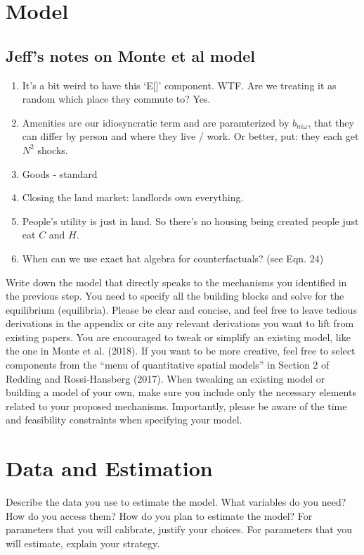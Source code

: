 \documentclass{article}
\begin{document}
\section{Model}

\subsection{Jeff's notes on Monte et al model}
\begin{enumerate}
\item It's a bit weird to have this `E[]' component. WTF. Are we treating it as random which place they commute to? Yes.
\item Amenities are our idiosyncratic term and are paramterized by $b_{ni\omega}$, that they can differ by person and where they live / work. Or better, put: they each get $N^2$ shocks.
\item Goods - standard
\item Closing the land market: landlords own everything.
\item People's utility is just in land. So there's no housing being created people just eat $C$ and $H$.
\item  When can we use exact hat algebra for counterfactuals? (see Eqn. 24)
\end{enumerate}

Write down the model that directly speaks to the mechanisms you identified
in the previous step. You need to specify all the building blocks and solve for the
equilibrium (equilibria). Please be clear and concise, and feel free to leave tedious
derivations in the appendix or cite any relevant derivations you want to lift from
existing papers.
You are encouraged to tweak or simplify an existing model, like the one in Monte et
al. (2018). If you want to be more creative, feel free to select components from the
“menu of quantitative spatial models” in Section 2 of Redding and Rossi-Hansberg
(2017). When tweaking an existing model or building a model of your own, make
sure you include only the necessary elements related to your proposed mechanisms.
Importantly, please be aware of the time and feasibility constraints when specifying
your model.

\section{Data and Estimation}
\label{sec:data}
Describe the data you use to estimate the model. What
variables do you need? How do you access them? How do you plan to estimate the
model? For parameters that you will calibrate, justify your choices. For parameters
that you will estimate, explain your strategy.
\end{document}
